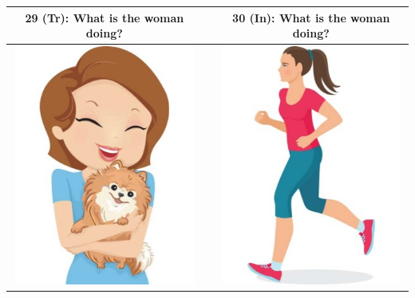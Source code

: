 \documentclass[12pt,notitlepage]{article}
\begin{document}
\begin{center}
\begin{tabular}{|c|c|c|}
\hline
29 (Tr): What is the woman doing? && 30 (In): What is the woman doing? \\
\hline
\includegraphics[width=16em,trim=0 0 0 -3]{figures/I29.jpg} & & \includegraphics[width=16em,trim=0 0 0 -3]{figures/I30.jpg} \\
\hline
\end{tabular}
\end{center}
\end{document}
